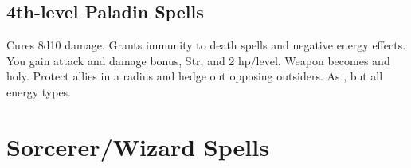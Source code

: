 \subsection{4th-level Paladin Spells}
\begin{spelllist}
 Cures 8d10 damage.
 Grants immunity to death spells and negative energy effects.
 You gain attack and damage bonus,  Str, and 2 hp/level.
 Weapon becomes  and holy.
 Protect allies in a \areamed radius and hedge out opposing outsiders.
 As , but all energy types. 
\end{spelllist}

\section{Sorcerer/Wizard Spells}
